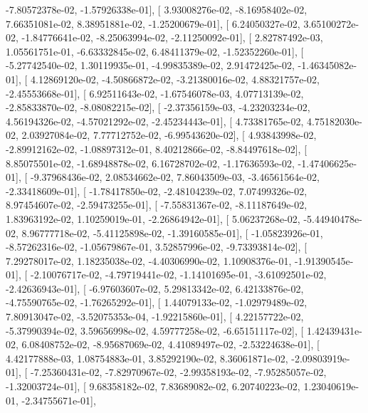\documentclass{article}
\begin{document}
         -7.80572378e-02,  -1.57926338e-01],
       [  3.93008276e-02,  -8.16958402e-02,   7.66351081e-02,
          8.38951881e-02,  -1.25200679e-01],
       [  6.24050327e-02,   3.65100272e-02,  -1.84776641e-02,
         -8.25063994e-02,  -2.11250092e-01],
       [  2.82787492e-03,   1.05561751e-01,  -6.63332845e-02,
          6.48411379e-02,  -1.52352260e-01],
       [ -5.27742540e-02,   1.30119935e-01,  -4.99835389e-02,
          2.91472425e-02,  -1.46345082e-01],
       [  4.12869120e-02,  -4.50866872e-02,  -3.21380016e-02,
          4.88321757e-02,  -2.45553668e-01],
       [  6.92511643e-02,  -1.67546078e-03,   4.07713139e-02,
         -2.85833870e-02,  -8.08082215e-02],
       [ -2.37356159e-03,  -4.23203234e-02,   4.56194326e-02,
         -4.57021292e-02,  -2.45234443e-01],
       [  4.73381765e-02,   4.75182030e-02,   2.03927084e-02,
          7.77712752e-02,  -6.99543620e-02],
       [  4.93843998e-02,  -2.89912162e-02,  -1.08897312e-01,
          8.40212866e-02,  -8.84497618e-02],
       [  8.85075501e-02,  -1.68948878e-02,   6.16728702e-02,
         -1.17636593e-02,  -1.47406625e-01],
       [ -9.37968436e-02,   2.08534662e-02,   7.86043509e-03,
         -3.46561564e-02,  -2.33418609e-01],
       [ -1.78417850e-02,  -2.48104239e-02,   7.07499326e-02,
          8.97454607e-02,  -2.59473255e-01],
       [ -7.55831367e-02,  -8.11187649e-02,   1.83963192e-02,
          1.10259019e-01,  -2.26864942e-01],
       [  5.06237268e-02,  -5.44940478e-02,   8.96777718e-02,
         -5.41125898e-02,  -1.39160585e-01],
       [ -1.05823926e-01,  -8.57262316e-02,  -1.05679867e-01,
          3.52857996e-02,  -9.73393814e-02],
       [  7.29278017e-02,   1.18235038e-02,  -4.40306990e-02,
          1.10908376e-01,  -1.91390545e-01],
       [ -2.10076717e-02,  -4.79719441e-02,  -1.14101695e-01,
         -3.61092501e-02,  -2.42636943e-01],
       [ -6.97603607e-02,   5.29813342e-02,   6.42133876e-02,
         -4.75590765e-02,  -1.76265292e-01],
       [  1.44079133e-02,  -1.02979489e-02,   7.80913047e-02,
         -3.52075353e-04,  -1.92215860e-01],
       [  4.22157722e-02,  -5.37990394e-02,   3.59656998e-02,
          4.59777258e-02,  -6.65151117e-02],
       [  1.42439431e-02,   6.08408752e-02,  -8.95687069e-02,
          4.41089497e-02,  -2.53224638e-01],
       [  4.42177888e-03,   1.08754883e-01,   3.85292190e-02,
          8.36061871e-02,  -2.09803919e-01],
       [ -7.25360431e-02,  -7.82970967e-02,  -2.99358193e-02,
         -7.95285057e-02,  -1.32003724e-01],
       [  9.68358182e-02,   7.83689082e-02,   6.20740223e-02,
          1.23040619e-01,  -2.34755671e-01],
\end{document}
